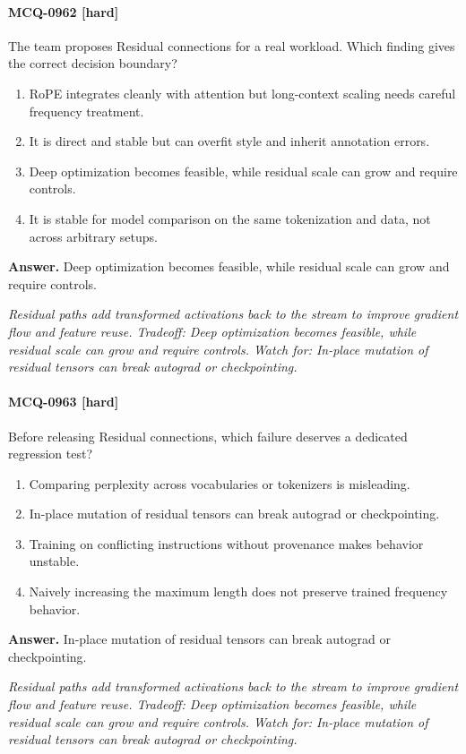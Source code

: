 \paragraph{MCQ-0962 [hard]} The team proposes Residual connections for a real workload. Which finding gives the correct decision boundary?
\begin{enumerate}[label=\Alph*.]
\item RoPE integrates cleanly with attention but long-context scaling needs careful frequency treatment.
\item It is direct and stable but can overfit style and inherit annotation errors.
\item Deep optimization becomes feasible, while residual scale can grow and require controls.
\item It is stable for model comparison on the same tokenization and data, not across arbitrary setups.
\end{enumerate}
\noindent\textbf{Answer.} Deep optimization becomes feasible, while residual scale can grow and require controls.
\par\textit{Residual paths add transformed activations back to the stream to improve gradient flow and feature reuse. Tradeoff: Deep optimization becomes feasible, while residual scale can grow and require controls. Watch for: In-place mutation of residual tensors can break autograd or checkpointing.}
\paragraph{MCQ-0963 [hard]} Before releasing Residual connections, which failure deserves a dedicated regression test?
\begin{enumerate}[label=\Alph*.]
\item Comparing perplexity across vocabularies or tokenizers is misleading.
\item In-place mutation of residual tensors can break autograd or checkpointing.
\item Training on conflicting instructions without provenance makes behavior unstable.
\item Naively increasing the maximum length does not preserve trained frequency behavior.
\end{enumerate}
\noindent\textbf{Answer.} In-place mutation of residual tensors can break autograd or checkpointing.
\par\textit{Residual paths add transformed activations back to the stream to improve gradient flow and feature reuse. Tradeoff: Deep optimization becomes feasible, while residual scale can grow and require controls. Watch for: In-place mutation of residual tensors can break autograd or checkpointing.}

